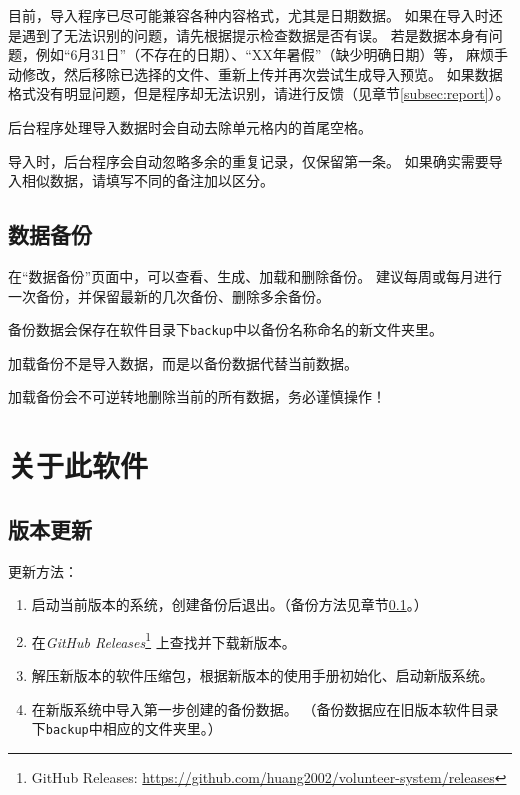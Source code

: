 \documentclass[12pt,titlepage]{article}
\newcommand{\githuburl}{https://github.com/huang2002/volunteer-system}
\newcommand{\releasesurl}{\githuburl/releases}
\begin{document}
目前，导入程序已尽可能兼容各种内容格式，尤其是日期数据。
如果在导入时还是遇到了无法识别的问题，请先根据提示检查数据是否有误。
若是数据本身有问题，例如“6月31日”（不存在的日期）、“XX年暑假”（缺少明确日期）等，
麻烦手动修改，然后移除已选择的文件、重新上传并再次尝试生成导入预览。
如果数据格式没有明显问题，但是程序却无法识别，请进行反馈（见章节\ref{subsec:report}）。

\begin{warnings}
    \item 后台程序处理导入数据时会自动去除单元格内的首尾空格。
    \item 导入时，后台程序会自动忽略多余的重复记录，仅保留第一条。
    如果确实需要导入相似数据，请填写不同的备注加以区分。
\end{warnings}

\subsection{数据备份}
\label{subsec:backup}

在“数据备份”页面中，可以查看、生成、加载和删除备份。
建议每周或每月进行一次备份，并保留最新的几次备份、删除多余备份。

备份数据会保存在软件目录下\texttt{backup}中以备份名称命名的新文件夹里。

\begin{warnings}
    \item 加载备份不是导入数据，而是以备份数据代替当前数据。
    \item 加载备份会不可逆转地删除当前的所有数据，务必谨慎操作！
\end{warnings}

\newpage
\section{关于此软件}

\subsection{版本更新}

更新方法：

\begin{enumerate}
    \item 启动当前版本的系统，创建备份后退出。（备份方法见章节\ref{subsec:backup}。）
    \item 在\textit{GitHub Releases}\footnote{GitHub Releases: \url{\releasesurl}}
          上查找并下载新版本。
    \item 解压新版本的软件压缩包，根据新版本的使用手册初始化、启动新版系统。
    \item 在新版系统中导入第一步创建的备份数据。
          （备份数据应在旧版本软件目录下\texttt{backup}中相应的文件夹里。）
\end{enumerate}
\end{document}
